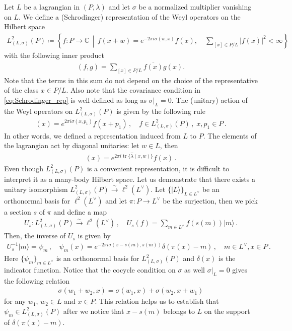 \documentclass[sn-mathphys-num]{sn-jnl}
\theoremstyle{definition}
\numberwithin{equation}{section}
\theoremstyle{definition}
\def\IC{\mathbb{C}}
\def\ra{\rangle}
\def\l{{\lambda}}
\def\hl{{\hat \lambda}}
\def\tr{\operatorname{tr}}
\begin{document}
Let $L$ be a lagrangian in $(P,\l)$ and let $\sigma$ be a normalized multiplier vanishing on $L$. We define a (Schrodinger) representation of the Weyl operators on the Hilbert space
\begin{align}\label{eq:Schrodinger_rep}
    L^2_{(L,\sigma)}(P)
    \coloneqq
    \left\{
        f:P\to\IC
        \,\middle|\,
        f(x+w)=e^{-2\pi i\sigma(w,x)}f(x),
        \quad
        \sum_{[x]\in P/L}|f(x)|^2<\infty
    \right\}
\end{align}
with the following inner product 
\begin{align}
    (f,g)
    =
    \sum_{[x]\in P/L}
    \overline{f(x)}g(x).
\end{align}
Note that the terms in this sum do not depend on the choice of the representative of the class $x\in P/L$. Also note that the covariance condition in \eqref{eq:Schrodinger_rep} is well-defined as long as $\sigma|_L=0$.
The (unitary) action of the Weyl operators  on $L^2_{(L,\sigma)}(P)$ is given by the following rule
\begin{align}
    [W(p_1)f](x)=e^{2\pi i\sigma(x,p_1)}f(x+p_1)\,,\quad f\in L^2_{(L,\sigma)}(P)\,,\;x,p_1\in P\,.
\end{align}
In other words, we defined a representation induced from $L$ to $P$. The elements of the lagrangian act by diagonal unitaries: let $w\in L$, then 
\begin{align}
    [W(w)f](x)=e^{2\pi i\tr \{\hl(x,w)\}}f(x)\,.
\end{align}
Even though $L^2_{(L,\sigma)}(P)$ is a convenient representation, it is difficult to interpret it as a many-body Hilbert space. Let us demonstrate that there exists a unitary isomorphism $L^2_{(L,\sigma)}(P)\xrightarrow{\sim}\ell^2(L^{\vee})$. Let $\{|L\ra\}_{L\in L^{\vee}}$ be an orthonormal basis for $\ell^2(L^{\vee})$ and let $\pi:P\to L^{\vee}$ be the surjection, then we pick a section $s$ of $\pi$ and define a map
\begin{align}
U_s:L^2_{(L,\sigma)}(P)\xrightarrow{\sim}\ell^2(L^{\vee})\,,\quad U_s(f)=\sum_{m\in L^{\vee}}f(s(m))|m\ra\,.
\end{align}
Then, the inverse of $U_s$ is given by 
\begin{align}
U_s^{-1}|m\ra=\psi_m\,,\quad \psi_m(x)=e^{-2\pi i \sigma(x-s(m),s(m))}\delta(\pi(x)-m)\,,\quad m\in L^{\vee},x\in P\,.
\end{align}
Here $\{\psi_m\}_{m\in L^{\vee}}$ is an orthonormal basis for $L^2_{(L,\sigma)}(P)$  and $\delta(x)$ is the indicator function.
Notice that the cocycle condition on $\sigma$ as well $\sigma|_L=0$ gives  the following relation
\begin{align}\label{key_property_of_sigmasigma}
\sigma(w_1+w_2,x)=\sigma(w_1,x)+\sigma(w_2,x+w_1)
\end{align}
for any $w_1$, $w_2\in L$ and $x\in P$. This relation helps us to establish that $\psi_m\in L^2_{(L,\sigma)}(P)$ after we notice that $x-s(m)$ belongs to $L$ on the support of $\delta(\pi(x)-m)$.
\end{document}
